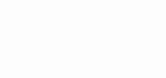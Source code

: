 \newcommand{\cccvname}{Bernd Zuther}
\newcommand{\cccvjobtitle}{IT Consultant Big Data}

\NoBgThispage
\AddToShipoutPicture*{\BackgroundPic}
\vspace*{18.5cm}
\noindent
\textcolor{white}{
{\Huge CV\_ \cccvname}\\[8pt]
{\huge (\cccvjobtitle)}\\
\\[8pt]
{\Large codecentric AG | \today}
}

